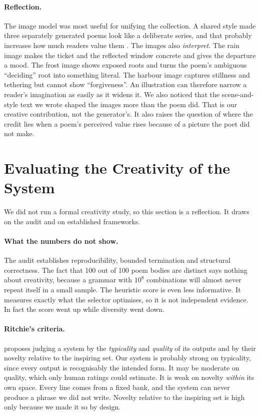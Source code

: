 \documentclass[letterpaper]{article}
\begin{document}
\paragraph{Reflection.}
The image model was most useful for unifying the collection. A shared
style made three separately generated poems look like a deliberate
series, and that probably increases how much readers value them
\citep{colton2008}. The images also \emph{interpret}. The rain image
makes the ticket and the reflected window concrete and gives the
departure a mood. The frost image shows exposed roots and turns the
poem's ambiguous ``deciding'' root into something literal. The harbour
image captures stillness and tethering but cannot show
``forgiveness''. An illustration can therefore narrow a reader's
imagination as easily as it widens it. We also noticed that the
scene-and-style text we wrote shaped the images more than the poem
did. That is our creative contribution, not the generator's. It also
raises the question of where the credit lies when a poem's perceived
value rises because of a picture the poet did not make.

\section{Evaluating the Creativity of the System}
We did not run a formal creativity study, so this section is a
reflection. It draws on the audit and on established frameworks.

\paragraph{What the numbers do not show.}
The audit establishes reproducibility, bounded termination and
structural correctness. The fact that 100 out of 100 poem bodies are
distinct says nothing about creativity, because a grammar with
$10^{8}$ combinations will almost never repeat itself in a small
sample. The heuristic score is even less informative. It measures
exactly what the selector optimises, so it is not independent
evidence. In fact the score went up while diversity went down.

\paragraph{Ritchie's criteria.}
\citet{ritchie2007} proposes judging a system by the \emph{typicality}
and \emph{quality} of its outputs and by their novelty relative to the
inspiring set. Our system is probably strong on typicality, since every
output is recognisably the intended form. It may be moderate on
quality, which only human ratings could estimate. It is weak on novelty
\emph{within} its own space. Every line comes from a fixed bank, and
the system can never produce a phrase we did not write. Novelty
relative to the inspiring set is high only because we made it so by
design.
\end{document}
